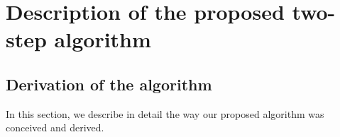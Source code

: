 \ifpdf
    \graphicspath{{3/figures/PNG/}{3/figures/PDF/}{3/figures/}}
\else
    \graphicspath{{3/figures/EPS/}{3/figures/}}
\fi

\chapter{Description of the proposed two-step algorithm} %
\label{OurMethod}
\section{Derivation of the algorithm}
In this section, we describe in detail the way our proposed algorithm was conceived and derived. 
